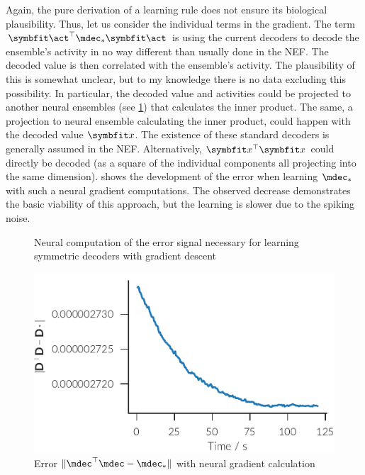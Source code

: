 Again, the pure derivation of a learning rule does not ensure its biological plausibility.
Thus, let us consider the individual terms in the gradient.
The term $\vc\act\Tr \mdec_* \vc\act$ is using the current decoders to decode the ensemble's activity in no way different than usually done in the NEF\@.
The decoded value is then correlated with the ensemble's activity.
The plausibility of this is somewhat unclear, but to my knowledge there is no data excluding this possibility.
In particular, the decoded value and activities could be projected to another neural ensembles (see \cref{fig:aml-grad-desc}) that calculates the inner product.
The same, a projection to neural ensemble calculating the inner product, could happen with the decoded value $\vc x$.
The existence of these standard decoders is generally assumed in the NEF\@.
Alternatively, $\vc x\Tr \vc x$ could directly be decoded (as a square of the individual components all projecting into the same dimension).
 shows the development of the error when learning $\mdec_*$ with such a neural gradient computations.
The observed decrease demonstrates the basic viability of this approach, but the learning is slower due to the spiking noise.
\begin{figure}
    \centering
    \caption{Neural computation of the error signal necessary for learning symmetric decoders with gradient descent}\label{fig:aml-grad-desc}
\end{figure}
\begin{figure}
    \centering
    \includegraphics{figures/aml-neural-grad-err}
    \caption{Error $\lVert \mdec\Tr\mdec - \mdec_*\rVert$ with neural gradient calculation}\label{fig:aml:neural-grad-err}
\end{figure}


